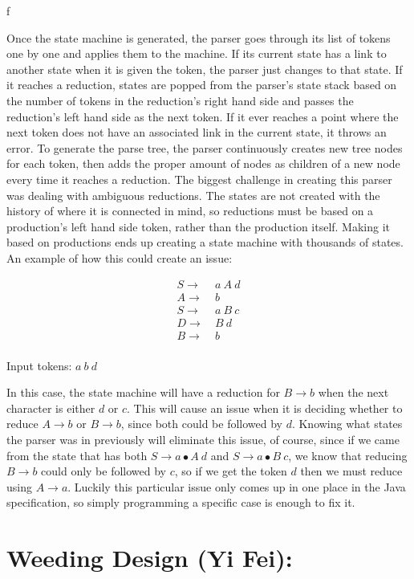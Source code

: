 f\documentclass[12pt]{article}
\begin{document}
Once the state machine is generated, the parser goes through its list of tokens one by one and
applies them to the machine. If its current state has a link to another state when it is given the
token, the parser just changes to that state.  If it reaches a reduction, states are popped from the
parser’s state stack based on the number of tokens in the reduction’s right hand side and passes the
reduction’s left hand side as the next token.  If it ever reaches a point where the next token does
not have an associated link in the current state, it throws an error. To generate the parse tree,
the parser continuously creates new tree nodes for each token, then adds the proper amount of nodes
as children of a new node every time it reaches a reduction. The biggest challenge in creating this
parser was dealing with ambiguous reductions.  The states are not created with the history of where
it is connected in mind, so reductions must be based on a production’s left hand side token, rather
than the production itself.  Making it based on productions ends up creating a state machine with
thousands of states. An example of how this could create an issue:

\begin{align*}
S \rightarrow & \ a \ A \ d \\
A \rightarrow & \ b \\
S \rightarrow & \ a \ B \ c \\
D \rightarrow & \ B \ d \\
B \rightarrow & \ b \\
\end{align*}

Input tokens: $a \ b \ d$


In this case, the state machine will have a reduction for $B \rightarrow b$ when the next character
is either $d$ or $c$.  This will cause an issue when it is deciding whether to reduce $A \rightarrow
b$ or $B \rightarrow b$, since both could be followed by $d$.  Knowing what states the parser was in
previously will eliminate this issue, of course, since if we came from the state that has both $S
\rightarrow a \bullet A \ d$ and $S \rightarrow a \bullet B \ c$, we know that reducing $B
\rightarrow b$ could only be followed by $c$, so if we get the token $d$ then we must reduce using
$A \rightarrow a$.  Luckily this particular issue only comes up in one place in the Java
specification, so simply programming a specific case is enough to fix it.


\section*{Weeding Design (Yi Fei):}
\end{document}
